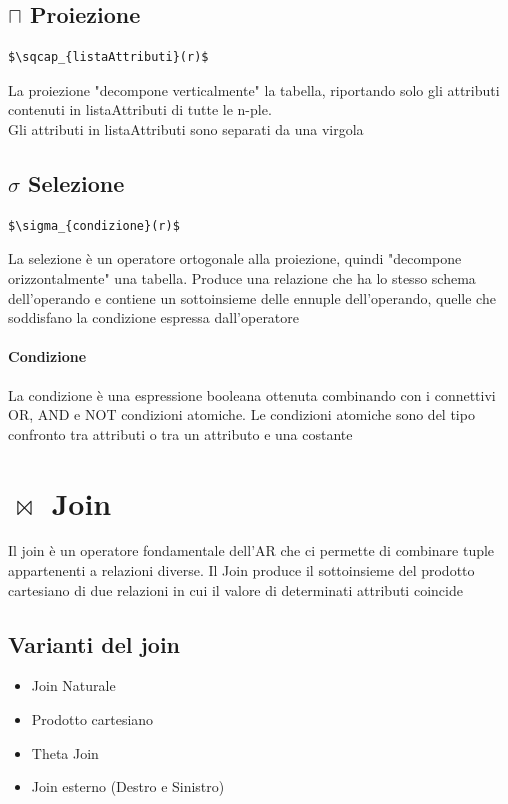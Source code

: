 \documentclass[12pt, a4paper, openany]{book}
\begin{document}
\subsection{$\sqcap$ Proiezione}
\begin{lstlisting}[mathescape=true]
$\sqcap_{listaAttributi}(r)$
\end{lstlisting}
La proiezione "decompone verticalmente" la tabella, riportando solo gli attributi contenuti in listaAttributi di tutte le n-ple.
\\Gli attributi in listaAttributi sono separati da una virgola

\subsection{$\sigma$ Selezione}
\begin{lstlisting}[mathescape=true]
$\sigma_{condizione}(r)$
\end{lstlisting}
La selezione è un operatore ortogonale alla proiezione, quindi "decompone orizzontalmente" una tabella. Produce una relazione che ha lo stesso schema dell'operando e contiene un sottoinsieme delle ennuple dell'operando, quelle che soddisfano la condizione espressa dall'operatore
\paragraph{Condizione}
La condizione è una espressione booleana ottenuta combinando con i connettivi OR, AND e NOT condizioni atomiche. Le condizioni atomiche sono del tipo confronto tra attributi o tra un attributo e una costante
\section{$\bowtie$ Join}
Il join è un operatore fondamentale dell'AR che ci permette di combinare tuple appartenenti a relazioni diverse. Il Join produce il sottoinsieme del prodotto cartesiano di due relazioni in cui il valore di determinati attributi coincide
\subsection*{Varianti del join}
\begin{itemize}
    \item Join Naturale
    \item Prodotto cartesiano
    \item Theta Join
    \item Join esterno (Destro e Sinistro)
\end{itemize}
\end{document}
